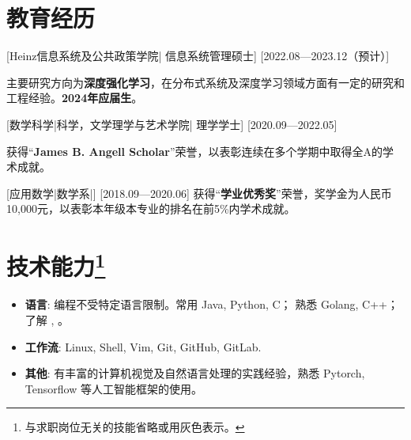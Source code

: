\documentclass{resume}
\begin{document}


\ResumeTitle


\section{教育经历}
[\textnormal{Heinz信息系统及公共政策学院|}  信息系统管理硕士]
[2022.08—2023.12（预计）]

主要研究方向为\textbf{深度强化学习}，在分布式系统及深度学习领域方面有一定的研究和工程经验。\textbf{2024年应届生}。


[\textnormal{数学科学|科学，文学理学与艺术学院|} 理学学士]
[2020.09—2022.05]

获得“\textbf{James B. Angell Scholar}”荣誉，以表彰连续在多个学期中取得全A的学术成就。

[\textnormal{应用数学|数学系|}]
[2018.09—2020.06]
获得“\textbf{学业优秀奖}”荣誉，奖学金为人民币10,000元，以表彰本年级本专业的排名在前5\%内学术成就。

\section[技术能力]{技术能力\protect\footnote{与求职岗位无关的技能省略或用灰色表示。}}
\begin{itemize}
  \item \textbf{语言}: 编程不受特定语言限制。常用 Java, Python, C； 熟悉 Golang, C++；了解 , 。
  \item \textbf{工作流}: Linux, Shell, Vim, Git, GitHub, GitLab.
  \item \textbf{其他}: 有丰富的计算机视觉及自然语言处理的实践经验，熟悉 Pytorch, Tensorflow 等人工智能框架的使用。
\end{itemize}
\end{document}
